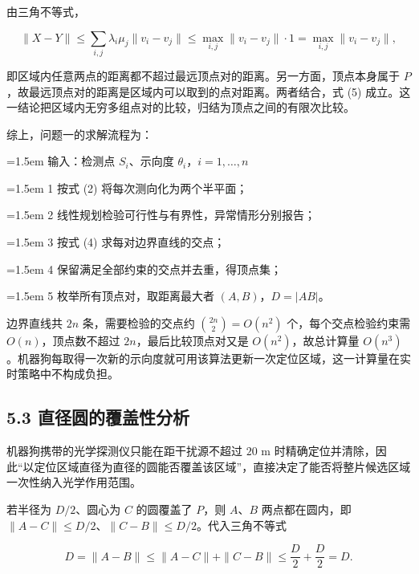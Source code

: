 \documentclass[UTF8,a4paper,zihao=-4,fontset=fandol]{ctexart}
\begin{document}
由三角不等式，

\[
\|X-Y\|\le\sum_{i,j}\lambda_i\mu_j\|v_i-v_j\|\le\max_{i,j}\|v_i-v_j\|\cdot1=\max_{i,j}\|v_i-v_j\|,
\]

即区域内任意两点的距离都不超过最远顶点对的距离。另一方面，顶点本身属于 $P$，故最远顶点对的距离是区域内可以取到的点对距离。两者结合，式 (5) 成立。这一结论把区域内无穷多组点对的比较，归结为顶点之间的有限次比较。

综上，问题一的求解流程为：

\begin{tcolorbox}[colback=black!2,colframe=black!22,boxrule=0.4pt,arc=0pt,left=9pt,right=9pt,top=7pt,bottom=7pt]
\small\setlength{\parskip}{2pt}
\noindent\hangindent=1.5em 输入：检测点 $S_i$、示向度 $\theta_i$，$i=1,\dots,n$\par
\noindent\hangindent=1.5em 1  按式 (2) 将每次测向化为两个半平面；\par
\noindent\hangindent=1.5em 2  线性规划检验可行性与有界性，异常情形分别报告；\par
\noindent\hangindent=1.5em 3  按式 (4) 求每对边界直线的交点；\par
\noindent\hangindent=1.5em 4  保留满足全部约束的交点并去重，得顶点集；\par
\noindent\hangindent=1.5em 5  枚举所有顶点对，取距离最大者 $(A,B)$，$D=|AB|$。\par
\end{tcolorbox}

边界直线共 $2n$ 条，需要检验的交点约 $\binom{2n}{2}=O(n^2)$ 个，每个交点检验约束需 $O(n)$，顶点数不超过 $2n$，最后比较顶点对又是 $O(n^2)$，故总计算量 $O(n^3)$。机器狗每取得一次新的示向度就可用该算法更新一次定位区域，这一计算量在实时策略中不构成负担。

\subsection*{5.3 直径圆的覆盖性分析}

机器狗携带的光学探测仪只能在距干扰源不超过 $20$ m 时精确定位并清除，因此“以定位区域直径为直径的圆能否覆盖该区域”，直接决定了能否将整片候选区域一次性纳入光学作用范围。

若半径为 $D/2$、圆心为 $C$ 的圆覆盖了 $P$，则 $A$、$B$ 两点都在圆内，即 $\|A-C\|\le D/2$、$\|C-B\|\le D/2$。代入三角不等式

\[
D=\|A-B\|\le\|A-C\|+\|C-B\|\le\frac D2+\frac D2=D .
\]
\end{document}
